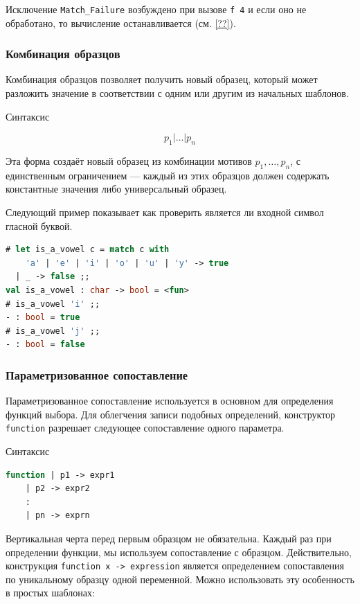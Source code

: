 Исключение \texttt{Match\_Failure} возбуждено при вызове \texttt{f 4} и если оно
не обработано, то вычисление останавливается (см. \ref{??}).

\subsubsection{Комбинация образцов}

Комбинация образцов позволяет получить новый образец, который может разложить
значение в соответствии с одним или другим из начальных шаблонов.

Синтаксис

$$
p_1 | \dots | p_n
$$

Эта форма создаёт новый образец из комбинации мотивов $p_1, \ldots, p_n$, с
единственным ограничением --- каждый из этих образцов должен содержать
константные значения либо универсальный образец.

Следующий пример показывает как проверить является ли входной символ гласной
буквой.

\begin{lstlisting}[language=OCaml]
# let is_a_vowel c = match c with
    'a' | 'e' | 'i' | 'o' | 'u' | 'y' -> true
  | _ -> false ;;
val is_a_vowel : char -> bool = <fun>
# is_a_vowel 'i' ;;
- : bool = true
# is_a_vowel 'j' ;;
- : bool = false
\end{lstlisting}

\subsubsection{Параметризованное сопоставление}

Параметризованное сопоставление используется в основном для определения функций
выбора. Для облегчения записи подобных определений, конструктор
\texttt{function} разрешает следующее сопоставление одного параметра.

Синтаксис

\begin{lstlisting}[language=OCaml]
function | p1 -> expr1
    | p2 -> expr2
    :
    | pn -> exprn
\end{lstlisting}

Вертикальная черта перед первым образцом не обязательна. Каждый раз при
определении функции, мы используем сопоставление с образцом. Действительно,
конструкция \texttt{function x -> expression} является определением
сопоставления по уникальному образцу одной переменной. Можно использовать эту
особенность в простых шаблонах:

